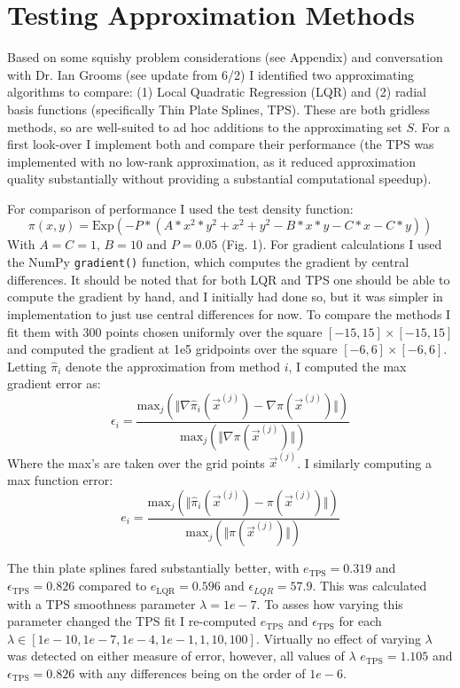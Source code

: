 \documentclass[12pt,a4paper]{article}
\begin{document}
\section{Testing Approximation Methods}
Based on some squishy problem considerations (see Appendix) and conversation with Dr. Ian Grooms (see update from 6/2) I identified two approximating algorithms to compare: (1) Local Quadratic Regression (LQR) and (2) radial basis functions (specifically Thin Plate Splines, TPS).  These are both gridless methods, so are well-suited to ad hoc additions to the approximating set $S$.  For a first look-over I implement both and compare their performance (the TPS was implemented with no low-rank approximation, as it reduced approximation quality substantially without providing a substantial computational speedup).

For comparison of performance I used the test density function:
\begin{equation}
\pi(x,y) = \text{Exp} \left( -P*(A*x^2*y^2 + x^2 + y^2 - B*x*y - C*x - C*y) \right)
\end{equation}
With $A = C = 1$, $ B =10$ and $ P = 0.05$ (Fig. 1).  For gradient calculations I used the NumPy \texttt{gradient()} function, which computes the gradient by central differences.  It should be noted that for both LQR and TPS one should be able to compute the gradient by hand, and I initially had done so, but it was simpler in implementation to just use central differences for now.  To compare the methods I fit them with 300 points chosen uniformly over the square $[-15,15] \times [-15,15]$ and computed the gradient at 1e5 gridpoints over the square $[-6,6] \times [-6,6]$.  Letting $\hat{\pi}_i$ denote the approximation from method $i$, I computed the max gradient error as:
\[
\epsilon_i = \frac{ \text{max}_{j} \left( \Vert \nabla \hat{\pi}_i(\vec{x}^{(j)}) - \nabla \pi(\vec{x}^{(j)})  \Vert \right) } { \text{max}_j \left( \Vert \nabla \pi(\vec{x}^{(j)}) \Vert \right) }
\]
Where the max's are taken over the grid points $\vec{x}^{(j)}$. I similarly computing a max function error:
\[
e_i = \frac{ \text{max}_{j} \left( \Vert \hat{\pi}_i(\vec{x}^{(j)}) - \pi(\vec{x}^{(j)})  \Vert \right) } { \text{max}_j \left( \Vert \pi(\vec{x}^{(j)}) \Vert \right) }
\]

The thin plate splines fared substantially better, with $e_{\text{TPS}} = 0.319$ and $\epsilon_{\text{TPS}} = 0.826$ compared to $e_{\text{LQR}} = 0.596$ and $\epsilon_{LQR} = 57.9$.  This was calculated with a TPS smoothness parameter $\lambda = 1e-7$.  To asses how varying this parameter changed the TPS fit I re-computed $e_{\text{TPS}}$ and $\epsilon_{\text{TPS}}$ for each $\lambda \in [1e-10, 1e-7,1e-4, 1e-1, 1, 10, 100]$.  Virtually no effect of varying $\lambda$ was detected on either measure of error, however, all values of $\lambda$ $e_\text{TPS} = 1.105$ and $\epsilon_\text{TPS} = 0.826$ with any differences being on the order of $1e-6$.
\end{document}
